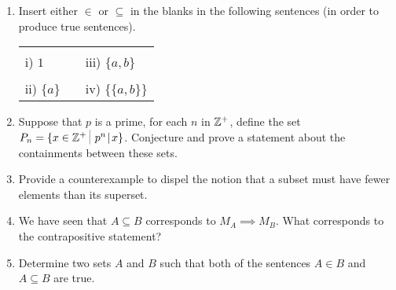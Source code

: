 \begin{enumerate}
\item Insert either $\in$ or $\subseteq$ in the blanks in the following 
sentences (in order to produce true sentences).


\begin{tabular}{lcl}
\rule{0pt}{16pt}i) $1$ \underline{\rule{36pt}{0pt}} $\{3, 2, 1, \{a, b\}\}$ & \rule{36pt}{0pt} & iii) $\{a, b\}$  \underline{\rule{36pt}{0pt}} $\{3, 2, 1, \{a, b\}\}$ \\
\rule{0pt}{16pt}ii) $\{a\}$ \underline{\rule{36pt}{0pt}} $\{a, \{a, b\}\}$ & &
iv) $\{\{a, b\}\}$  \underline{\rule{36pt}{0pt}} $\{a, \{a, b\}\}$ \\
\end{tabular}

\hint{$\in$, $\subseteq$, $\in$, $\subseteq$}

\item  Suppose that $p$ is a prime, for each $n$ in ${\mathbb Z}^+$, 
define the set $P_n = \{ x \in \Integers^+ \suchthat \, p^n \divides x \}$.  
Conjecture and prove a statement about the containments between these sets.


\item  Provide a counterexample to dispel the notion that a subset must
have fewer elements than its superset.


\item  We have seen that $A \subseteq B$ corresponds to $M_A \implies M_B$.
What corresponds to the contrapositive statement?

 

\item Determine two sets $A$ and $B$ such that both of the sentences
$A \in B$ and $A \subseteq B$ are true.



\end{enumerate}
